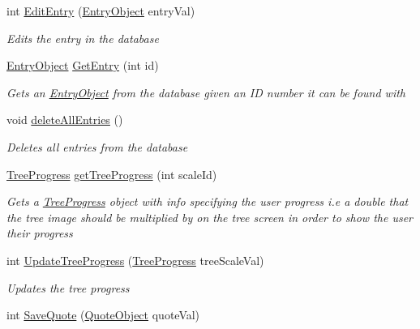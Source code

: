 \begin{DoxyCompactItemize}
int \hyperlink{class_intention_journal_1_1_app_database_a07232a4f14f877fc9e46cf57aad2bfae}{Edit\+Entry} (\hyperlink{class_intention_journal_1_1_entry_object}{Entry\+Object} entry\+Val)
\begin{DoxyCompactList}\small\item\em Edits the entry in the database \end{DoxyCompactList}\item 
\hyperlink{class_intention_journal_1_1_entry_object}{Entry\+Object} \hyperlink{class_intention_journal_1_1_app_database_ac06d1fa6aeb5a2eb479b7d6c0f47cb94}{Get\+Entry} (int id)
\begin{DoxyCompactList}\small\item\em Gets an \hyperlink{class_intention_journal_1_1_entry_object}{Entry\+Object} from the database given an ID number it can be found with \end{DoxyCompactList}\item 
void \hyperlink{class_intention_journal_1_1_app_database_a090f896fa5b8ffc96273462294202950}{delete\+All\+Entries} ()
\begin{DoxyCompactList}\small\item\em Deletes all entries from the database \end{DoxyCompactList}\item 
\hyperlink{class_intention_journal_1_1_tree_progress}{Tree\+Progress} \hyperlink{class_intention_journal_1_1_app_database_ab9fd2bf2734c6e0e57380ee0b65a19e5}{get\+Tree\+Progress} (int scale\+Id)
\begin{DoxyCompactList}\small\item\em Gets a \hyperlink{class_intention_journal_1_1_tree_progress}{Tree\+Progress} object with info specifying the user progress i.\+e a double that the tree image should be multiplied by on the tree screen in order to show the user their progress \end{DoxyCompactList}\item 
int \hyperlink{class_intention_journal_1_1_app_database_a3b41cf46222b022becb63af220d7e1b6}{Update\+Tree\+Progress} (\hyperlink{class_intention_journal_1_1_tree_progress}{Tree\+Progress} tree\+Scale\+Val)
\begin{DoxyCompactList}\small\item\em Updates the tree progress \end{DoxyCompactList}\item 
int \hyperlink{class_intention_journal_1_1_app_database_a9beec77d3440f42c47bfe6592fb3107f}{Save\+Quote} (\hyperlink{class_intention_journal_1_1_quote_object}{Quote\+Object} quote\+Val)

\end{DoxyCompactItemize}
